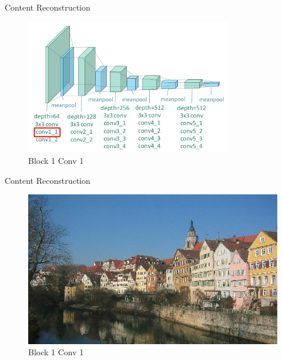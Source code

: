 \documentclass{beamer}
\begin{document}
\begin{frame}{Content Reconstruction}
\begin{figure}[ht]
\centering
\includegraphics[width=0.8\textwidth]{img/vgg19/content/block1_conv1}
\caption*{Block 1 Conv 1}
\end{figure}
\end{frame}

\begin{frame}{Content Reconstruction}
\begin{figure}[ht]
\centering
\includegraphics[width=.9\textwidth]{img/content/block1_conv1.png}
\caption*{Block 1 Conv 1}
\end{figure}
\end{frame}
\end{document}
